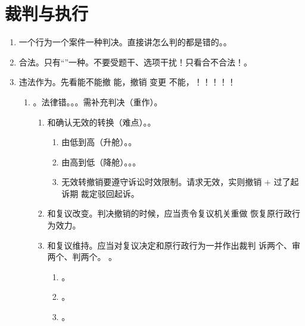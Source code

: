 \section{裁判与执行}
\begin{enumerate}
  \item 一个行为一个案件一种判决。直接讲怎么判的都是错的。。
  \item 合法。只有“”一种。不要受题干、选项干扰！只看合不合法！。
  \item 违法作为。先看能不能撤 \yjt 能，撤销 \hz 变更 \yjt 不能，！！！！！
        \begin{enumerate}
          \item {}。\yi 法律错。\er {}。。\san 需补充判决（重作）。
                \begin{enumerate}
                  \item 和确认无效的转换（难点）。。
                        \begin{enumerate}
                          \item 由低到高（升舱）。。
                          \item 由高到低（降舱）。。。
                          \item 无效转撤销要遵守诉讼时效限制。请求无效，实则撤销 + 过了起诉期 \yjt 裁定驳回起诉。
                        \end{enumerate}
                  \item 和复议改变。判决撤销的时候，应当责令复议机关重做 \hz 恢复原行政行为效力。
                  \item 和复议维持。应当对复议决定和原行政行为一并作出裁判 \yjt 诉两个、审两个、判两个。
                        。
                        \begin{enumerate}
                          \item {}。
                          \item {}。
                          \item {}。

\end{enumerate}
\end{enumerate}
\end{enumerate}
\end{enumerate}
